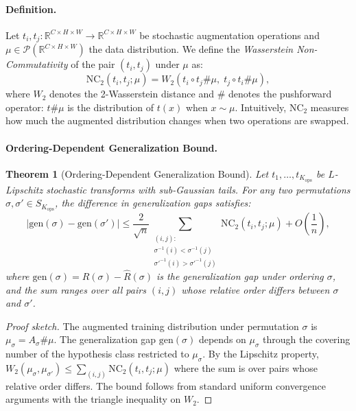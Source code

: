 \documentclass{article}
\newtheorem{theorem}{Theorem}
\begin{document}
\paragraph{Definition.}
Let $t_i, t_j : \mathbb{R}^{C \times H \times W} \to \mathbb{R}^{C \times H \times W}$ be stochastic augmentation operations and $\mu \in \mathcal{P}(\mathbb{R}^{C \times H \times W})$ the data distribution. We define the \emph{Wasserstein Non-Commutativity} of the pair $(t_i, t_j)$ under $\mu$ as:
\begin{equation}
\text{NC}_2(t_i, t_j; \mu) = W_2\!\left(t_i \circ t_j \# \mu,\; t_j \circ t_i \# \mu\right),
\end{equation}
where $W_2$ denotes the 2-Wasserstein distance and $\#$ denotes the pushforward operator: $t \# \mu$ is the distribution of $t(x)$ when $x \sim \mu$. Intuitively, NC$_2$ measures how much the augmented distribution changes when two operations are swapped.

\paragraph{Ordering-Dependent Generalization Bound.}

\begin{theorem}[Ordering-Dependent Generalization Bound]
Let $t_1, \ldots, t_{K_\text{ops}}$ be $L$-Lipschitz stochastic transforms with sub-Gaussian tails. For any two permutations $\sigma, \sigma' \in S_{K_\text{ops}}$, the difference in generalization gaps satisfies:
\begin{equation}
\left|\mathrm{gen}(\sigma) - \mathrm{gen}(\sigma')\right| \leq \frac{2}{\sqrt{n}} \sum_{\substack{(i,j):\\ \sigma^{-1}(i) < \sigma^{-1}(j) \\ \sigma'^{-1}(i) > \sigma'^{-1}(j)}} \mathrm{NC}_2(t_i, t_j; \mu) + O\!\left(\frac{1}{n}\right),
\end{equation}
where $\mathrm{gen}(\sigma) = R(\sigma) - \hat{R}(\sigma)$ is the generalization gap under ordering $\sigma$, and the sum ranges over all pairs $(i,j)$ whose relative order differs between $\sigma$ and $\sigma'$.
\end{theorem}

\begin{proof}[Proof sketch]
The augmented training distribution under permutation $\sigma$ is $\mu_\sigma = A_\sigma \# \mu$. The generalization gap $\mathrm{gen}(\sigma)$ depends on $\mu_\sigma$ through the covering number of the hypothesis class restricted to $\mu_\sigma$. By the Lipschitz property, $W_2(\mu_\sigma, \mu_{\sigma'}) \leq \sum_{(i,j)} \text{NC}_2(t_i, t_j; \mu)$ where the sum is over pairs whose relative order differs. The bound follows from standard uniform convergence arguments with the triangle inequality on $W_2$.
\end{proof}
\end{document}
